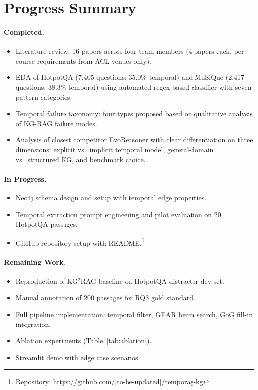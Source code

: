 \documentclass[11pt]{article}
\begin{document}
\section{Progress Summary}

\paragraph{Completed.}
\begin{itemize}
  \item Literature review: 16 papers across four team members
    (4 papers each, per course requirements from ACL venues only).
  \item EDA of HotpotQA (7,405 questions: 35.0\% temporal) and
    MuSiQue (2,417 questions: 38.3\% temporal) using automated
    regex-based classifier with seven pattern categories.
  \item Temporal failure taxonomy: four types proposed based on
    qualitative analysis of KG-RAG failure modes.
  \item Analysis of closest competitor EvoReasoner \cite{evoreasonerevokg2025}
    with clear differentiation on three dimensions: explicit vs.\
    implicit temporal model, general-domain vs.\ structured KG,
    and benchmark choice.
\end{itemize}

\paragraph{In Progress.}
\begin{itemize}
  \item Neo4j schema design and setup with temporal edge properties.
  \item Temporal extraction prompt engineering and pilot evaluation
    on 20 HotpotQA passages.
  \item GitHub repository setup with README.\footnote{
    Repository: \url{https://github.com/[to-be-updated]/temporag-kg}}
\end{itemize}

\paragraph{Remaining Work.}
\begin{itemize}
  \item Reproduction of KG$^2$RAG baseline on HotpotQA distractor dev set.
  \item Manual annotation of 200 passages for RQ3 gold standard.
  \item Full pipeline implementation: temporal filter, GEAR beam search,
    GoG fill-in integration.
  \item Ablation experiments (Table~\ref{tab:ablation}).
  \item Streamlit demo with edge case scenarios.
\end{itemize}
\end{document}
